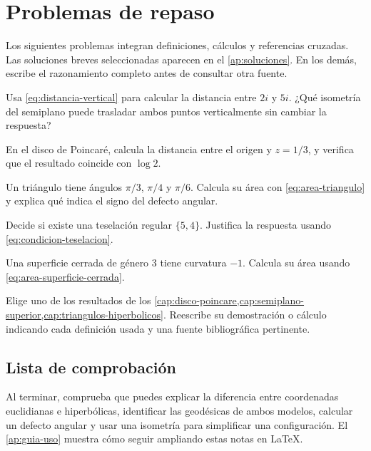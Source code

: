 \chapter{Problemas de repaso}
\label{cap:problemas-repaso}

Los siguientes problemas integran definiciones, cálculos y referencias cruzadas. Las soluciones breves seleccionadas aparecen en el \cref{ap:soluciones}. En los demás, escribe el razonamiento completo antes de consultar otra fuente.

\begin{problem}
Usa \cref{eq:distancia-vertical} para calcular la distancia entre \(2i\) y \(5i\). ¿Qué isometría del semiplano puede trasladar ambos puntos verticalmente sin cambiar la respuesta?
\label{prob:verticales}
\end{problem}

\begin{problem}
En el disco de Poincaré, calcula la distancia entre el origen y \(z=1/3\), y verifica que el resultado coincide con \(\log 2\).
\label{prob:radial}
\end{problem}

\begin{problem}
Un triángulo tiene ángulos \(\pi/3\), \(\pi/4\) y \(\pi/6\). Calcula su área con \cref{eq:area-triangulo} y explica qué indica el signo del defecto angular.
\label{prob:area-triangulo}
\end{problem}

\begin{problem}
Decide si existe una teselación regular \(\{5,4\}\). Justifica la respuesta usando \cref{eq:condicion-teselacion}.
\label{prob:teselacion}
\end{problem}

\begin{problem}
Una superficie cerrada de género \(3\) tiene curvatura \(-1\). Calcula su área usando \cref{eq:area-superficie-cerrada}.
\label{prob:superficie}
\end{problem}

\begin{problem}
Elige uno de los resultados de los \cref{cap:disco-poincare,cap:semiplano-superior,cap:triangulos-hiperbolicos}. Reescribe su demostración o cálculo indicando cada definición usada y una fuente bibliográfica pertinente.
\label{prob:lectura}
\end{problem}

\section{Lista de comprobación}

Al terminar, comprueba que puedes explicar la diferencia entre coordenadas euclidianas e hiperbólicas, identificar las geodésicas de ambos modelos, calcular un defecto angular y usar una isometría para simplificar una configuración. El \cref{ap:guia-uso} muestra cómo seguir ampliando estas notas en LaTeX.
